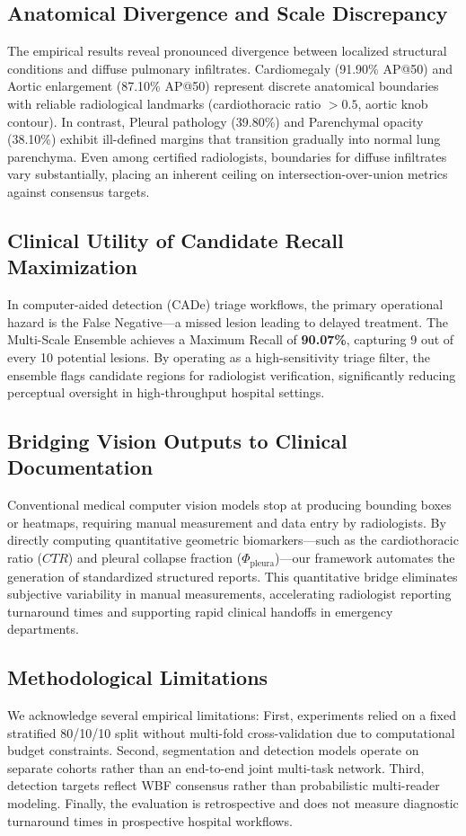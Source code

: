 \documentclass[10pt,twocolumn,letterpaper]{article}
\begin{document}
\subsection{Anatomical Divergence and Scale Discrepancy}
The empirical results reveal pronounced divergence between localized structural conditions and diffuse pulmonary infiltrates. Cardiomegaly (91.90\% AP@50) and Aortic enlargement (87.10\% AP@50) represent discrete anatomical boundaries with reliable radiological landmarks (cardiothoracic ratio $>0.5$, aortic knob contour). In contrast, Pleural pathology (39.80\%) and Parenchymal opacity (38.10\%) exhibit ill-defined margins that transition gradually into normal lung parenchyma. Even among certified radiologists, boundaries for diffuse infiltrates vary substantially, placing an inherent ceiling on intersection-over-union metrics against consensus targets.

\subsection{Clinical Utility of Candidate Recall Maximization}
In computer-aided detection (CADe) triage workflows, the primary operational hazard is the False Negative---a missed lesion leading to delayed treatment. The Multi-Scale Ensemble achieves a Maximum Recall of \textbf{90.07\%}, capturing 9 out of every 10 potential lesions. By operating as a high-sensitivity triage filter, the ensemble flags candidate regions for radiologist verification, significantly reducing perceptual oversight in high-throughput hospital settings.

\subsection{Bridging Vision Outputs to Clinical Documentation}
Conventional medical computer vision models stop at producing bounding boxes or heatmaps, requiring manual measurement and data entry by radiologists. By directly computing quantitative geometric biomarkers---such as the cardiothoracic ratio ($CTR$) and pleural collapse fraction ($\Phi_{\text{pleura}}$)---our framework automates the generation of standardized structured reports. This quantitative bridge eliminates subjective variability in manual measurements, accelerating radiologist reporting turnaround times and supporting rapid clinical handoffs in emergency departments.

\subsection{Methodological Limitations}
We acknowledge several empirical limitations:
First, experiments relied on a fixed stratified 80/10/10 split without multi-fold cross-validation due to computational budget constraints. Second, segmentation and detection models operate on separate cohorts rather than an end-to-end joint multi-task network. Third, detection targets reflect WBF consensus rather than probabilistic multi-reader modeling. Finally, the evaluation is retrospective and does not measure diagnostic turnaround times in prospective hospital workflows.
\end{document}
